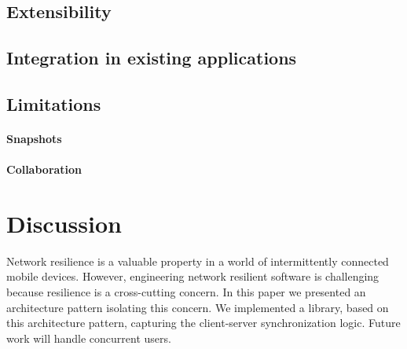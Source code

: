 \documentclass{llncs}
\begin{document}
\subsection{Extensibility}

\subsection{Integration in existing applications}

\subsection{Limitations}

\paragraph{Snapshots}

\paragraph{Collaboration}

\section{Discussion}

Network resilience is a valuable property in a world of intermittently connected mobile devices. However, engineering network resilient software is challenging because resilience is a cross-cutting concern. In this paper we presented an architecture pattern isolating this concern. We implemented a library, based on this architecture pattern, capturing the client-server synchronization logic. Future work will handle concurrent users.



\end{document}
